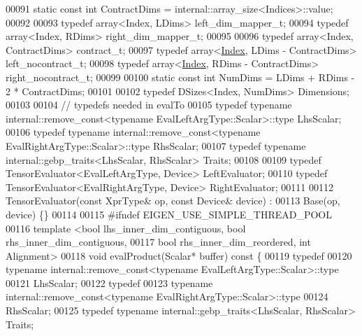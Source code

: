 \begin{DoxyCode}
00091   \textcolor{keyword}{static} \textcolor{keyword}{const} \textcolor{keywordtype}{int} ContractDims = internal::array\_size<Indices>::value;
00092 
00093   \textcolor{keyword}{typedef} array<Index, LDims> left\_dim\_mapper\_t;
00094   \textcolor{keyword}{typedef} array<Index, RDims> right\_dim\_mapper\_t;
00095 
00096   \textcolor{keyword}{typedef} array<Index, ContractDims> contract\_t;
00097   \textcolor{keyword}{typedef} array<\hyperlink{namespace_eigen_a62e77e0933482dafde8fe197d9a2cfde}{Index}, LDims - ContractDims> left\_nocontract\_t;
00098   \textcolor{keyword}{typedef} array<\hyperlink{namespace_eigen_a62e77e0933482dafde8fe197d9a2cfde}{Index}, RDims - ContractDims> right\_nocontract\_t;
00099 
00100   \textcolor{keyword}{static} \textcolor{keyword}{const} \textcolor{keywordtype}{int} NumDims = LDims + RDims - 2 * ContractDims;
00101 
00102   \textcolor{keyword}{typedef} DSizes<Index, NumDims> Dimensions;
00103 
00104   \textcolor{comment}{// typedefs needed in evalTo}
00105   \textcolor{keyword}{typedef} \textcolor{keyword}{typename} internal::remove\_const<typename EvalLeftArgType::Scalar>::type LhsScalar;
00106   \textcolor{keyword}{typedef} \textcolor{keyword}{typename} internal::remove\_const<typename EvalRightArgType::Scalar>::type RhsScalar;
00107   \textcolor{keyword}{typedef} \textcolor{keyword}{typename} internal::gebp\_traits<LhsScalar, RhsScalar> Traits;
00108 
00109   \textcolor{keyword}{typedef} TensorEvaluator<EvalLeftArgType, Device> LeftEvaluator;
00110   \textcolor{keyword}{typedef} TensorEvaluator<EvalRightArgType, Device> RightEvaluator;
00111 
00112   TensorEvaluator(\textcolor{keyword}{const} XprType& op, \textcolor{keyword}{const} Device& device) :
00113       Base(op, device) \{\}
00114 
00115 \textcolor{preprocessor}{#ifndef EIGEN\_USE\_SIMPLE\_THREAD\_POOL}
00116   \textcolor{keyword}{template} <\textcolor{keywordtype}{bool} lhs\_inner\_dim\_contiguous, \textcolor{keywordtype}{bool} rhs\_inner\_dim\_contiguous,
00117             \textcolor{keywordtype}{bool} rhs\_inner\_dim\_reordered, \textcolor{keywordtype}{int} Alignment>
00118   \textcolor{keywordtype}{void} evalProduct(Scalar* buffer)\textcolor{keyword}{ const }\{
00119     \textcolor{keyword}{typedef}
00120         \textcolor{keyword}{typename} internal::remove\_const<typename EvalLeftArgType::Scalar>::type
00121             LhsScalar;
00122     \textcolor{keyword}{typedef}
00123         \textcolor{keyword}{typename} internal::remove\_const<typename EvalRightArgType::Scalar>::type
00124             RhsScalar;
00125     \textcolor{keyword}{typedef} \textcolor{keyword}{typename} internal::gebp\_traits<LhsScalar, RhsScalar> Traits;

\end{DoxyCode}
